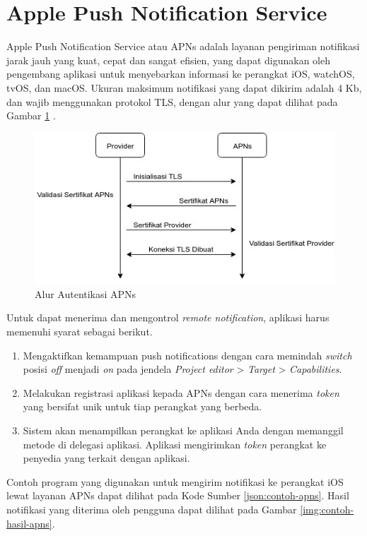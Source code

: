 \section{Apple Push Notification Service}
\par Apple Push Notification Service atau APNs adalah layanan pengiriman notifikasi jarak jauh yang kuat, cepat dan sangat efisien, yang dapat digunakan oleh pengembang aplikasi untuk menyebarkan informasi ke perangkat iOS, watchOS, tvOS, dan macOS. Ukuran maksimum notifikasi yang dapat dikirim adalah 4 Kb, dan wajib menggunakan protokol TLS, dengan alur yang dapat dilihat pada Gambar \ref{img:apns-certificate} \cite{apns-online}.
\begin{figure}[H]
	\centering\includegraphics[width=1\textwidth]{bab2/img/activity-apns_certificate_connection.jpg}
	\caption{Alur Autentikasi APNs}
	\label{img:apns-certificate}
\end{figure}
\par Untuk dapat menerima dan mengontrol \textit{remote notification}, aplikasi harus memenuhi syarat sebagai berikut.
\begin{enumerate}
	\item Mengaktifkan kemampuan push notifications dengan cara memindah \textit{switch} posisi \textit{off} menjadi \textit{on} pada jendela \textit{Project editor} > \textit{Target} > \textit{Capabilities}.
	\item Melakukan registrasi aplikasi kepada APNs dengan cara menerima \textit{token} yang bersifat unik untuk tiap perangkat yang berbeda.
	\item Sistem akan menampilkan perangkat ke aplikasi Anda dengan memanggil metode di delegasi aplikasi. Aplikasi mengirimkan \textit{token} perangkat ke penyedia yang terkait dengan aplikasi.
\end{enumerate}
\par Contoh program yang digunakan untuk mengirim notifikasi ke perangkat iOS lewat layanan APNs dapat dilihat pada Kode Sumber \ref{json:contoh-apns}. Hasil notifikasi yang diterima oleh pengguna dapat dilihat pada Gambar \ref{img:contoh-hasil-apns}.
